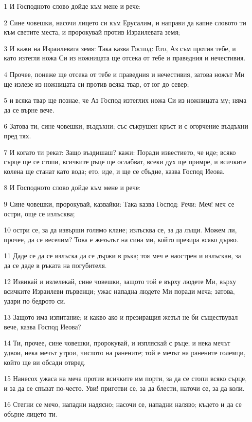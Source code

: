 \par 1 И Господното слово дойде към мене и рече:
\par 2 Сине човешки, насочи лицето си към Ерусалим, и направи да капне словото ти към светите места, и пророкувай против Израилевата земя;
\par 3 И кажи на Израилевата земя: Така казва Господ: Ето, Аз съм против тебе, и като изтегля ножа Си из ножницата ще отсека от тебе и праведния и нечестивия.
\par 4 Прочее, понеже ще отсека от тебе и праведния и нечестивия, затова ножът Ми ще излезе из ножницата си против всяка твар, от юг до север;
\par 5 и всяка твар ще познае, че Аз Господ изтеглих ножа Си из ножницата му; няма да се върне вече.
\par 6 Затова ти, сине човешки, въздъхни; със съкрушен кръст и с огорчение въздъхни пред тях.
\par 7 И когато ти рекат: Защо въздишаш? кажи: Поради известието, че иде; всяко сърце ще се стопи, всичките ръце ще ослабват, всеки дух ще примре, и всичките колена ще станат като вода; ето, иде, и ще се сбъдне, казва Господ Иеова.
\par 8 И Господното слово дойде към мене и рече:
\par 9 Сине човешки, пророкувай, казвайки: Така казва Господ: Речи: Меч! меч се остри, още се излъсква;
\par 10 остри се, за да извърши голямо клане; излъсква се, за да лъщи. Можем ли, прочее, да се веселим? Това е жезълът на сина ми, който презира всяко дърво.
\par 11 Даде се да се излъска да се държи в ръка; тоя меч е наострен и излъскан, за да се даде в ръката на погубителя.
\par 12 Извикай и излелекай, сине човешки, защото той е върху людете Ми, върху всичките Израилеви първенци; ужас нападна людете Ми поради меча; затова, удари по бедрото си.
\par 13 Защото има изпитание; и какво ако и презиращия жезъл не би съществувал вече, казва Господ Иеова?
\par 14 Ти, прочее, сине човешки, пророкувай, и изпляскай с ръце; и нека мечът удвои, нека мечът утрои, числото на ранените; той е мечът на ранените големци, който ще ви обсади отвред.
\par 15 Нанесох ужаса на меча против всичките им порти, за да се стопи всяко сърце, и за да се спъват по-често. Уви! приготви се, за да блести, наточи се, за да коли.
\par 16 Стегни се мечо, нападни надясно; насочи се, нападни наляво; където и да се обърне лицето ти.
